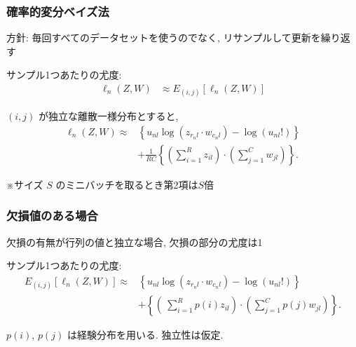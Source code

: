 \documentclass[dvipdfmx, dvipsnames]{beamer}
\begin{document}
\begin{frame}
\frametitle{確率的変分ベイズ法}

方針: 毎回すべてのデータセットを使うのでなく, リサンプルして更新を繰り返す

\vfill

サンプル1つあたりの尤度: 
\begin{align*}
\ell_n (Z, W)& \approx E_{(i,j)} [\ell_n (Z, W)]  
\end{align*}

$(i,j)$ が独立な離散一様分布とすると,
\begin{align*}
\ell_n (Z, W) \approx  &\left\{{u_{nl} \log(z_{r_nl} \cdot w_{c_nl})}  - \log(u_{nl}!) \right\} \\
&+ \frac{1}{RC}\left\{ \left( \sum_{i=1}^{R} z_{il} \right) \cdot \left( \sum_{j=1}^{C} w_{jl}\right) \right\}.
\end{align*}

\vfill

※サイズ $S$ のミニバッチを取るとき第2項は$S$倍
\end{frame}

\begin{frame}
\frametitle{欠損値のある場合}

欠損の有無が行列の値と独立な場合, 欠損の部分の尤度は1

\vfill

サンプル1つあたりの尤度:
\begin{align*}
E_{(i,j)} [ \ell_n (Z, W)] \approx  &\left\{{u_{nl} \log(z_{r_nl} \cdot w_{c_nl})}  - \log(u_{nl}!) \right\} \\
&+ \left\{ \left(\ \sum_{i=1}^{R} p(i)z_{il} \right) \cdot \left( \sum_{j=1}^{C} p(j) w_{jl}\right) \right\}.
\end{align*}

$p(i)$, $p(j)$ は経験分布を用いる. 独立性は仮定. 
\end{frame}
\end{document}
